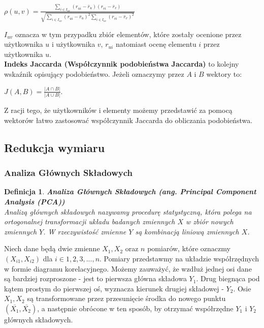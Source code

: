 \documentclass[12pt,a4paper]{report}
\newtheorem{df}{Definicja}
\begin{document}
\begin{center}
$\rho(u,v) = \frac{\sum_{i\in I_{uv}}(r_{ui}-\overline{r}_u)(r_{vi}-\overline{r}_v)}{\sqrt{\sum_{i\in I_{uv}}(r_{ui}-\overline{r}_u)^2 \sum_{i\in I_{uv}}(r_{vi}-\overline{r}_v)^2}}$
\end{center}
$I_{uv}$ oznacza w tym przypadku zbiór elementów, które zostały ocenione przez użytkownika $u$ i użytkownika $v$, $r_{ui}$ natomiast ocenę elementu $i$ przez użytkownika $u$.
\\\textbf{Indeks Jaccarda (Współczynnik podobieństwa Jaccarda)} to kolejny wskaźnik opisujący podobieństwo. Jeżeli oznaczymy przez $A$ i $B$ wektory to:
\begin{center}
$J(A,B)=\frac{|A\cap B|}{|A \cup B|}$.
\end{center}
Z racji tego, że użytkowników i elementy możemy przedstawić za pomocą wektorów łatwo zastosować współczynnik Jaccarda do obliczania podobieństwa.

\subsection{Redukcja wymiaru}
\subsubsection{Analiza Głównych Składowych}

\begin{df}\textbf{Analiza Głównych Składowych (ang. Principal Component Analysis (PCA))}
\\Analizą głównych składowych nazywamy procedurę statystyczną, która polega na ortogonalnej transformacji układu badanych zmiennych $X$ w zbiór nowych zmiennych $Y$. W rzeczywistość zmienne $Y$ są kombinacją liniową zmiennych $X$.
\end{df}
Niech dane będą dwie zmienne $X_1, X_2$ oraz $n$ pomiarów, które oznaczmy $(X_{i1},X_{i2})$ dla $i \in {1,2,3,...,n}$. Pomiary przedstawmy na układzie współrzędnych w formie diagramu korelacyjnego. Możemy zauważyć, że wzdłuż jednej osi dane są bardziej rozproszone - jest to pierwsza główna składowa $Y_1$. Drug biegnąca pod kątem prostym do pierwszej oś, wyznacza kierunek drugiej składowej - $Y_2$. Osie $X_1, X_2$ są transformowane przez przesunięcie środka do nowego punktu $(\overline{X_1},\overline{X_2})$, a następnie obrócone w ten sposób, by otrzymać współrzędne $Y_1$ i $Y_2$ głównych składowych.
\end{document}
